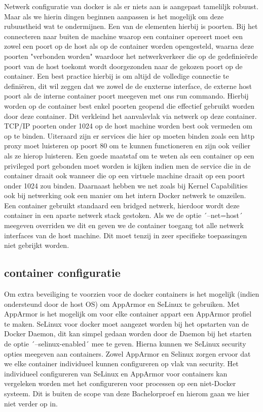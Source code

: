 Netwerk configuratie van docker is als er niets aan is aangepast tameliljk robuust. Maar als we hierin dingen beginnen aanpassen is het mogelijk om deze rubuustheid wat te ondermijnen. Een van de elementen hierbij is poorten. Bij het connecteren naar buiten de machine waarop een container opereert moet een zowel een poort op de host als op de container worden opengesteld, waarna deze poorten "verbonden worden" waardoor het netwerkverkeer die op de gedefinieërde poort van de host toekomt wordt doorgezonden naar de gekozen poort op de container. Een best practice hierbij is om altijd de volledige connectie te definiëren, dit wil zeggen dat we zowel de de enxterne interface, de externe host poort als de interne container poort meegeven met ons run commando. Hierbij worden op de container best enkel poorten geopend die effectief gebruikt worden door deze container. Dit verkleind het aanvalsvlak via netwerk op deze container. TCP/IP poorten onder 1024 op de host machine worden best ook vermeden om op te binden. Uiteraard zijn er services die hier op moeten binden zoals een http proxy moet luisteren op poort 80 om te kunnen functioneren en zijn ook veilier als ze hierop luisteren. Een goede maatstaf om te weten als een container op een privileged port gebonden moet worden is kijken indien men de service die in de container draait ook wanneer die op een virtuele machine draait op een poort onder 1024 zou binden. Daarnaast hebben we net zoals bij Kernel Capabilities ook bij netwerking ook een manier om het intern Docker netwerk te omzeilen. Een container gebruikt standaard een bridged netwerk, hierdoor wordt deze container in een aparte netwerk stack gestoken. Als we de optie ´--net=host´ meegeven overriden we dit en geven we de container toegang tot alle netwerk interfaces van de host machine. Dit moet tenzij in zeer specifieke toepassingen niet gebrijkt worden.


\subsection{container configuratie}

Om extra beveiliging te voorzien voor de docker containers is het mogelijk (indien ondersteund door de host OS) om AppArmor en SeLinux te gebruiken. Met AppArmor is het mogelijk om voor elke container appart een AppArmor profiel te maken. SeLinux voor docker moet aangezet worden bij het opstarten van de Docker Daemon, dit kan simpel gedaan worden door de Daemon bij het starten de optie ´--selinux-enabled´ mee te geven. Hierna kunnen we SeLinux security opties meegeven aan containers. Zowel AppArmor en Selinux zorgen ervoor dat we elke container individueel kunnen configureren op vlak van security. Het individueel configureren van SeLinux en AppArmor voor containers kan vergeleken worden met het configureren voor processen op een niet-Docker systeem. Dit is buiten de scope van deze Bachelorproef en hierom gaan we hier niet verder op in.

